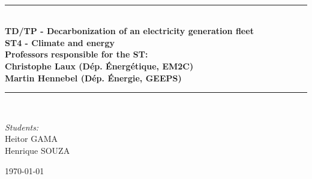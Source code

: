 \documentclass[a4paper]{report}
\begin{document}
\newcommand{\HRule}{\rule{\linewidth}{0.5mm}}


    \begin{titlepage}
    \thispagestyle{fancy}
    \fancyfoot{}
    
    \begin{center}
    
    \textsc{\Large }\\[0.5cm]
    
    \vspace*{\fill}
    
    \HRule\\[0.4cm]
    {\huge\bfseries TD/TP - Decarbonization of an electricity generation fleet \\[0.4cm]}
    {\large\bfseries ST4 - Climate and energy\\[0.4cm]}
    {\large\bfseries Professors responsible for the ST:\\Christophe Laux (Dép. Énergétique, EM2C)\\
Martin Hennebel (Dép. Énergie, GEEPS)\textit{}\\}
    \HRule\\[1.5cm]
    
    \vspace*{\fill}
    
    \begin{minipage}{0.4\textwidth}
    \begin{flushleft} \large
    \emph{Students:}\\
		Heitor GAMA\\
        Henrique SOUZA
    \end{flushleft}
    
    \end{minipage}
    
    
    \vfill
    
    {\large \today}
    
    \end{center}
    \end{titlepage}

\restoregeometry

\newpage
{}
\pagestyle{empty}
\end{document}
